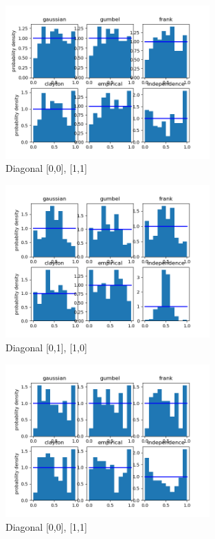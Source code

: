 \clearpage




\begin{figure}[h]
	\centering
	\includegraphics[width=0.7\textwidth]{RTS/2020-07-23_21_00-2020-07-23_22_00-0.png}
	\caption{Diagonal [0,0], [1,1]}
\end{figure}

\begin{figure}[h]
	\centering
	\includegraphics[width=0.7\textwidth]{RTS/2020-07-23_21_00-2020-07-23_22_00-1.png}
	\caption{Diagonal [0,1], [1,0]}
\end{figure}


\begin{figure}[h]
	\centering
	\includegraphics[width=0.7\textwidth]{RTS/2020-10-09_12_00-2020-10-09_13_00-0.png}
	\caption{Diagonal [0,0], [1,1]}
\end{figure}

